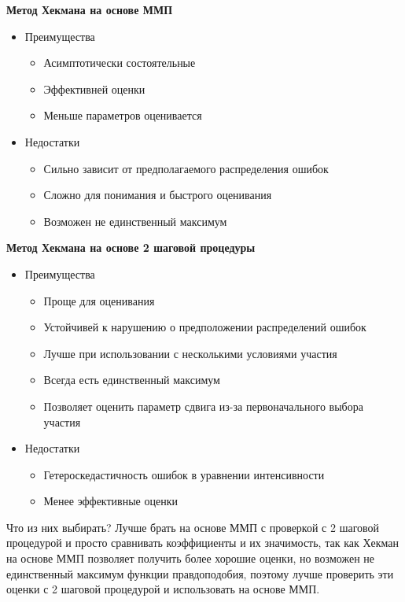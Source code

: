 \documentclass[a4paper,12pt]{article}
\begin{document}
\textbf{Метод Хекмана на основе ММП}

\begin{itemize}
	\item Преимущества
	\begin{itemize}
	\item Асимптотически состоятельные
	\item Эффективней оценки
	\item Меньше параметров оценивается
\end{itemize}
	
	\item Недостатки
		\begin{itemize}
			\item Сильно зависит от предполагаемого распределения ошибок
			\item Сложно для понимания и быстрого оценивания
			\item Возможен не единственный максимум
		\end{itemize}
\end{itemize}

\textbf{Метод Хекмана на основе 2 шаговой процедуры}

\begin{itemize}
	\item Преимущества
	\begin{itemize}
		\item Проще для оценивания
		\item Устойчивей к нарушению о предположении распределений ошибок
		\item  Лучше при использовании с несколькими условиями участия
		\item  Всегда есть единственный максимум
		\item Позволяет оценить параметр сдвига из-за первоначального выбора участия
		
	\end{itemize}
	
	\item Недостатки
	\begin{itemize}
		\item Гетероскедастичность ошибок в уравнении интенсивности
		\item Менее эффективные оценки
	\end{itemize}
\end{itemize}

Что из них выбирать? Лучше брать на основе ММП с проверкой с 2 шаговой процедурой и просто сравнивать коэффициенты и их значимость, так как Хекман на основе ММП позволяет получить более хорошие оценки, но возможен не единственный максимум функции правдоподобия, поэтому лучше проверить эти оценки с 2 шаговой процедурой и использовать на основе ММП.
\end{document}
